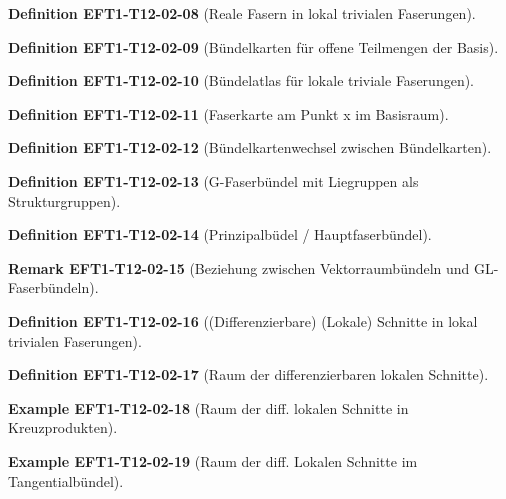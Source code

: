 \documentclass[10pt, letterpaper]{article}
\newcommand{\CustomHeading}[3]{%
  \par\medskip\noindent%
  \textbf{#1 #2} \textnormal{(#3)}.\enskip%
}
\newenvironment{DEF}[2]{\CustomHeading{Definition}{#1}{#2}}{}
\newenvironment{REM}[2]{\CustomHeading{Remark}{#1}{#2}}{}
\newenvironment{EXA}[2]{\CustomHeading{Example}{#1}{#2}}{}
\begin{document}
\begin{DEF}{EFT1-T12-02-08}{Reale Fasern in lokal trivialen Faserungen}
\end{DEF}

\begin{DEF}{EFT1-T12-02-09}{Bündelkarten für offene Teilmengen der Basis}
\end{DEF}

\begin{DEF}{EFT1-T12-02-10}{Bündelatlas für lokale triviale Faserungen}
\end{DEF}

\begin{DEF}{EFT1-T12-02-11}{Faserkarte am Punkt x im Basisraum}
\end{DEF}

\begin{DEF}{EFT1-T12-02-12}{Bündelkartenwechsel zwischen Bündelkarten}
\end{DEF}

\begin{DEF}{EFT1-T12-02-13}{G-Faserbündel mit Liegruppen als Strukturgruppen}
\end{DEF}

\begin{DEF}{EFT1-T12-02-14}{Prinzipalbüdel / Hauptfaserbündel}
\end{DEF}

\begin{REM}{EFT1-T12-02-15}{Beziehung zwischen Vektorraumbündeln und GL-Faserbündeln}
\end{REM}

\begin{DEF}{EFT1-T12-02-16}{(Differenzierbare) (Lokale) Schnitte in lokal trivialen Faserungen}
\end{DEF}

\begin{DEF}{EFT1-T12-02-17}{Raum der differenzierbaren lokalen Schnitte}
\end{DEF}

\begin{EXA}{EFT1-T12-02-18}{Raum der diff. lokalen Schnitte in Kreuzprodukten}
\end{EXA}

\begin{EXA}{EFT1-T12-02-19}{Raum der diff. Lokalen Schnitte im Tangentialbündel}
\end{EXA}
\end{document}
